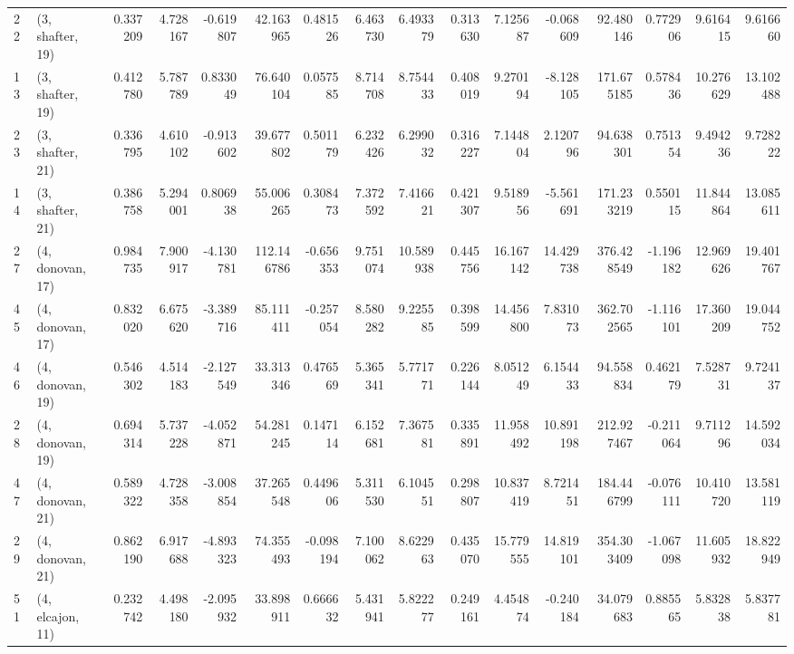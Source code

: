 \begin{tabular}{llrrrrrrrrrrrrrr}
22 &  (3, shafter, 19) &   0.337209 &   4.728167 & -0.619807 &   42.163965 &  0.481526 &   6.463730 &   6.493379 &  0.313630 &   7.125687 &  -0.068609 &   92.480146 &  0.772906 &   9.616415 &   9.616660 \\
13 &  (3, shafter, 19) &   0.412780 &   5.787789 &  0.833049 &   76.640104 &  0.057585 &   8.714708 &   8.754433 &  0.408019 &   9.270194 &  -8.128105 &  171.675185 &  0.578436 &  10.276629 &  13.102488 \\
23 &  (3, shafter, 21) &   0.336795 &   4.610102 & -0.913602 &   39.677802 &  0.501179 &   6.232426 &   6.299032 &  0.316227 &   7.144804 &   2.120796 &   94.638301 &  0.751354 &   9.494236 &   9.728222 \\
14 &  (3, shafter, 21) &   0.386758 &   5.294001 &  0.806938 &   55.006265 &  0.308473 &   7.372592 &   7.416621 &  0.421307 &   9.518956 &  -5.561691 &  171.233219 &  0.550115 &  11.844864 &  13.085611 \\
27 &  (4, donovan, 17) &   0.984735 &   7.900917 & -4.130781 &  112.146786 & -0.656353 &   9.751074 &  10.589938 &  0.445756 &  16.167142 &  14.429738 &  376.428549 & -1.196182 &  12.969626 &  19.401767 \\
45 &  (4, donovan, 17) &   0.832020 &   6.675620 & -3.389716 &   85.111411 & -0.257054 &   8.580282 &   9.225585 &  0.398599 &  14.456800 &   7.831073 &  362.702565 & -1.116101 &  17.360209 &  19.044752 \\
46 &  (4, donovan, 19) &   0.546302 &   4.514183 & -2.127549 &   33.313346 &  0.476569 &   5.365341 &   5.771771 &  0.226144 &   8.051249 &   6.154433 &   94.558834 &  0.462179 &   7.528731 &   9.724137 \\
28 &  (4, donovan, 19) &   0.694314 &   5.737228 & -4.052871 &   54.281245 &  0.147114 &   6.152681 &   7.367581 &  0.335891 &  11.958492 &  10.891198 &  212.927467 & -0.211064 &   9.711296 &  14.592034 \\
47 &  (4, donovan, 21) &   0.589322 &   4.728358 & -3.008854 &   37.265548 &  0.449606 &   5.311530 &   6.104551 &  0.298807 &  10.837419 &   8.721451 &  184.446799 & -0.076111 &  10.410720 &  13.581119 \\
29 &  (4, donovan, 21) &   0.862190 &   6.917688 & -4.893323 &   74.355493 & -0.098194 &   7.100062 &   8.622963 &  0.435070 &  15.779555 &  14.819101 &  354.303409 & -1.067098 &  11.605932 &  18.822949 \\
51 &  (4, elcajon, 11) &   0.232742 &   4.498180 & -2.095932 &   33.898911 &  0.666632 &   5.431941 &   5.822277 &  0.249161 &   4.454874 &  -0.240184 &   34.079683 &  0.885565 &   5.832838 &   5.837781 \\

\end{tabular}
